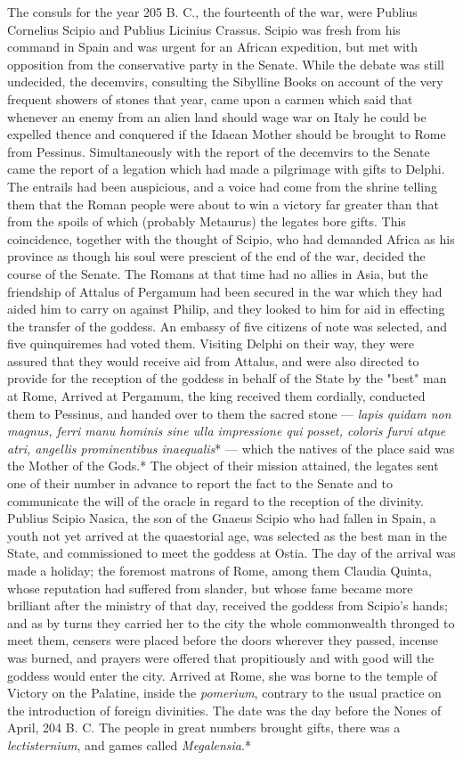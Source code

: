 \documentclass[a4paper, 11pt, oneside, polutonikogreek, english]{article}
\begin{document}
The consuls for the year 205 B. C., the fourteenth of the war, were Publius Cornelius Scipio and Publius Licinius Crassus. Scipio was fresh from his command in Spain and was urgent for an African expedition, but met with opposition from the conservative party in the Senate. While the debate was still undecided, the decemvirs, consulting the Sibylline Books on account of the very frequent showers of stones that year, came upon a carmen which said that whenever an enemy from an alien land should wage war on Italy he could be expelled thence and conquered if the Idaean Mother should be brought to Rome from Pessinus. Simultaneously with the report of the decemvirs to the Senate came the report of a legation which had made a pilgrimage with gifts to Delphi. The entrails had been auspicious, and a voice had come from the shrine telling them that the Roman people were about to win a victory far greater than that from the spoils of which (probably Metaurus) the legates bore gifts. This coincidence, together with the thought of Scipio, who had demanded Africa as his province as though his soul were prescient of the end of the war, decided the course of the Senate. The Romans at that time had no allies in Asia, but the friendship of Attalus of Pergamum had been secured in the war which they had aided him to carry on against Philip, and they looked to him for aid in effecting the transfer of the goddess. An embassy of five citizens of note was selected, and five quinquiremes had voted them. Visiting Delphi on their way, they were assured that they would receive aid from Attalus, and were also directed to provide for the reception of the goddess in behalf of the State by the "best" man at Rome, Arrived at Pergamum, the king received them cordially, conducted them to Pessinus, and handed over to them the sacred stone --- \emph{lapis quidam non magnus, ferri manu hominis sine ulla impressione qui posset, coloris furvi atque atri, angellis prominentibus inaequalis}* --- which the natives of the place said was the Mother of the Gods.* The object of their mission attained, the legates sent one of their number in advance to report the fact to the Senate and to communicate the will of the oracle in regard to the reception of the divinity. Publius Scipio Nasica, the son of the Gnaeus Scipio who had fallen in Spain, a youth not yet arrived at the quaestorial age, was selected as the best man in the State, and commissioned to meet the goddess at Ostia. The day of the arrival was made a holiday; the foremost matrons of Rome, among them Claudia Quinta, whose reputation had suffered from slander, but whose fame became more brilliant after the ministry of that day, received the goddess from Scipio's hands; and as by turns they carried her to the city the whole commonwealth thronged to meet them, censers were placed before the doors wherever they passed, incense was burned, and prayers were offered that propitiously and with good will the goddess would enter the city. Arrived at Rome, she was borne to the temple of Victory on the Palatine, inside the \emph{pomerium}, contrary to the usual practice on the introduction of foreign divinities. The date was the day before the Nones of April, 204 B. C. The people in great numbers brought gifts, there was a \emph{lectisternium}, and games called \emph{Megalensia}.*
\end{document}
